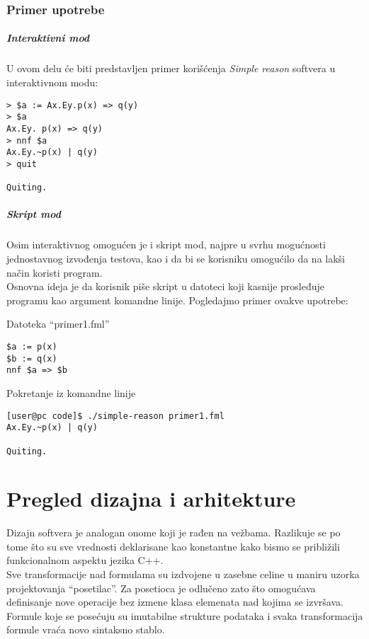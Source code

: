 \documentclass[a4paper]{article}
\begin{document}
\subsubsection{Primer upotrebe}
\subparagraph{Interaktivni mod}
U ovom delu će biti predstavljen primer korišćenja \textit{Simple reason} softvera u interaktivnom modu:
\begin{verbatim}
> $a := Ax.Ey.p(x) => q(y)
> $a
Ax.Ey. p(x) => q(y)
> nnf $a
Ax.Ey.~p(x) | q(y)
> quit

Quiting.
\end{verbatim}

\subparagraph{Skript mod}
Osim interaktivnog omogućen je i skript mod, najpre u svrhu mogućnosti jednostavnog izvođenja testova, kao i da bi se korisniku omogućilo da na lakši način koristi program.\\ 
Osnovna ideja je da korisnik piše skript u datoteci koji kasnije prosleđuje programu kao argument komandne linije. Pogledajmo primer ovakve upotrebe:

\bigskip
Datoteka ``primer1.fml''
\begin{verbatim}
$a := p(x)
$b := q(x)
nnf $a => $b
\end{verbatim}


\bigskip
Pokretanje iz komandne linije
\begin{verbatim}
[user@pc code]$ ./simple-reason primer1.fml
Ax.Ey.~p(x) | q(y)

Quiting.
\end{verbatim}

\section{Pregled dizajna i arhitekture}
\label{sec:dizajn}
Dizajn softvera je analogan onome koji je rađen na vežbama. Razlikuje se po tome što su sve vrednosti deklarisane kao konstantne kako bismo se približili funkcionalnom aspektu jezika C++.\\
Sve transformacije nad formulama su izdvojene u zasebne celine u maniru uzorka projektovanja ``posetilac''. Za posetioca je odlučeno zato što omogućava definisanje nove operacije bez izmene klasa elemenata nad kojima se izvršava. Formule koje se posećuju su imutabilne strukture podataka i svaka transformacija formule vraća novo sintaksno stablo.
\end{document}
